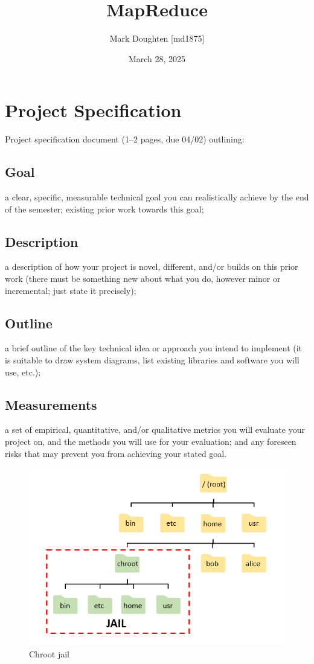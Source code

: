 \documentclass{article}
\title{MapReduce}
\author{Mark Doughten [md1875]}
\date{March 28, 2025}
\begin{document}
\maketitle
\section{Project Specification}

Project specification document (1--2 pages, due 04/02) outlining:

\subsection{Goal}
a clear, specific, measurable technical goal you can realistically achieve by the end of the semester;
existing prior work towards this goal;

\subsection{Description}
a description of how your project is novel, different, and/or builds on this prior work (there must be something new about what you do, however minor or incremental; just state it precisely);

\subsection{Outline}
a brief outline of the key technical idea or approach you intend to implement (it is suitable to draw system diagrams, list existing libraries and software you will use, etc.);

\subsection{Measurements}
a set of empirical, quantitative, and/or qualitative metrics you will evaluate your project on, and the methods you will use for your evaluation; and
any foreseen risks that may prevent you from achieving your stated goal.

\begin{figure}[ht]
    \centering
    \includegraphics[width=1\linewidth]{./images/Chroot-1.png}
    \caption{Chroot jail \cite{chroot-jail}}
    \label{fig:chroot}
\end{figure}
\end{document}
